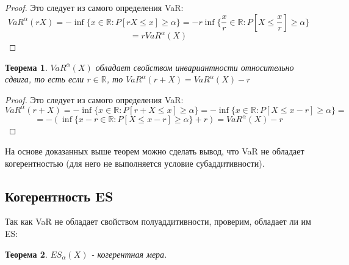 \documentclass[14pt,a4paper]{article}
\theoremstyle{plain}
\newtheorem{Th}{Теорема}[section]
\theoremstyle{definition}
\begin{document}
\begin{proof}
Это следует из самого определения VaR:
$$
VaR^\alpha(rX) = -\inf\{x\in \mathbb{R} : P[rX \le x] \ge \alpha\} =  -r\inf\{\frac{x}{r}\in \mathbb{R} : P[X \le \frac{x}{r}] \ge \alpha\}
$$
$$
 = r VaR^\alpha(X)
$$
\end{proof}

\begin{Th} \label{main} $VaR^\alpha(X)$ обладает свойством инвариантности относительно сдвига, то есть если $r \in \mathbb{R}$, то $VaR^\alpha(r+X) = VaR^\alpha(X) - r$
\end{Th}

\begin{proof}
Это следует из самого определения VaR:
$$
VaR^\alpha(r+X) = -\inf\{x\in \mathbb{R} : P[r+X \le x] \ge \alpha\} = -\inf\{x\in \mathbb{R} : P[X \le x-r] \ge \alpha\} =
$$
$$
 = -(\inf\{x-r\in \mathbb{R} : P[X \le x-r] \ge \alpha\} + r) = VaR^\alpha(X) - r
$$
\end{proof}

На основе доказанных выше теорем можно сделать вывод, что VaR не обладает когерентностью (для него не выполняется условие субаддитивности).

 \subsection{Когерентность ES}





Так как VaR не обладает свойством полуаддитивности, проверим, обладает ли им ES:

\begin{Th} \label{main} $ES_\alpha(X)$ - когерентная мера.
\end{Th}
\end{document}
